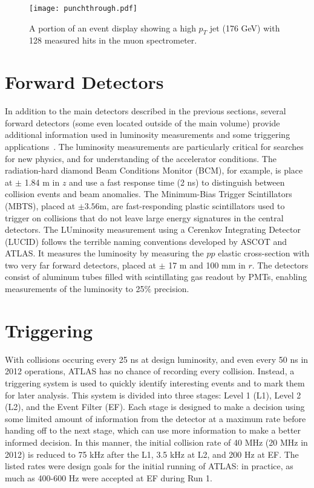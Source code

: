 

\begin{figure}
\centering
\texttt{[image: punchthrough.pdf]}
\label{fig:detector:punchthrough}
\caption{A portion of an event display showing a high $p_T$ jet (176 GeV) with 128 measured hits in the muon spectrometer.}
\end{figure}


\section{Forward Detectors}

In addition to the main detectors described in the previous sections, several forward detectors (some even located outside of the main volume) provide additional information used in luminosity measurements and some triggering applications~\cite{ATLASPaper}. The luminosity measurements are particularly critical for searches for new physics, and for understanding of the accelerator conditions. The radiation-hard diamond Beam Conditions Monitor (BCM), for example, is place at $\pm$ 1.84 m in $z$ and use a fast response time (2 ns) to distinguish between collision events and beam anomalies. The Minimum-Bias Trigger Scintillators (MBTS), placed at $\pm 3.56$m, are fast-responding plastic scintillators used to trigger on collisions that do not leave large energy signatures in the central detectors. The LUminosity measurement using a Cerenkov Integrating Detector (LUCID) follows the terrible naming conventions developed by ASCOT and ATLAS. It measures the luminosity by measuring the $pp$ elastic cross-section with two very far forward detectors, placed at $\pm$ 17 m and 100 mm in $r$. The detectors consist of aluminum tubes filled with scintillating gas readout by PMTs, enabling measurements of the luminosity to 25$\%$ precision.

\section{Triggering}

With collisions occuring every 25 ns at design luminosity, and even every 50 ns in 2012 operations, ATLAS has no chance of recording every collision. Instead, a triggering system is used to quickly identify interesting events and to mark them for later analysis\cite{ATLASPaper,Trigger2010}. This system is divided into three stages: Level 1 (L1), Level 2 (L2), and the Event Filter (EF). Each stage is designed to make a decision using some limited amount of information from the detector at a maximum rate before handing off to the next stage, which can use more information to make a better informed decision. In this manner, the initial collision rate of 40 MHz (20 MHz in 2012) is reduced to 75 kHz after the L1, 3.5 kHz at L2, and 200 Hz at EF. The listed rates were design goals for the initial running of ATLAS: in practice, as much as 400-600 Hz were accepted at EF during Run 1.

